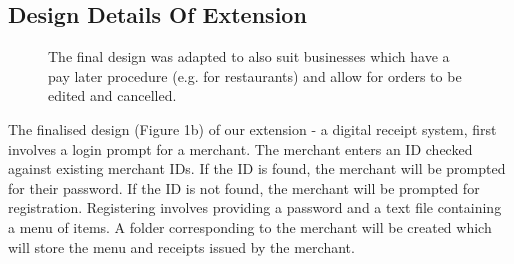 \documentclass[11pt]{article}
\begin{document}
\subsection{Design Details Of Extension}
\begin{figure}[h]
\centering
    \qquad
    \caption{The final design was adapted to also suit businesses which have a pay later procedure (e.g. for restaurants) and allow for orders to be edited and cancelled.}%
    \label{fig:example}%
\end{figure}
The finalised design (Figure 1b) of our extension - a digital receipt system, first involves a login prompt for a merchant. The merchant enters an ID checked against existing merchant IDs. If the ID is found, the merchant will be prompted for their password. If the ID is not found, the merchant will be prompted for registration. Registering involves providing a password and a text file containing a menu of items. A folder corresponding to the merchant will be created which will store the menu and receipts issued by the merchant. 
\end{document}
